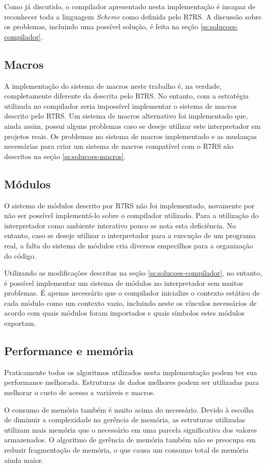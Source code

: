 Como já discutido, o compilador apresentado nesta implementação é incapaz
de reconhecer toda a linguagem \textit{Scheme} como definida pelo \acs{R7RS}.
A discussão sobre os problemas, incluindo uma possível solução, é feita na 
seção \ref{ss:solucoes-compilador}.

\subsection{Macros}
\label{ss:macros-resultados}

A implementação do sistema de macros neste trabalho é, na verdade,
completamente diferente da descrita pelo \acs{R7RS}. No entanto, com a
estratégia utilizada no compilador seria impossível implementar o sistema de
macros descrito pelo \acs{R7RS}. Um sistema de macros alternativo foi
implementado que, ainda assim, possui alguns problemas caso se deseje utilizar
este interpretador em projetos reais. Os problemas no sistema de macros
implementado e as mudanças necessárias para criar um sistema de macros
compatível com o \acs{R7RS} são descritos na seção \ref{ss:solucoes-macros}.

\subsection{Módulos}
\label{ss:modulos-resultados}

O sistema de módulos descrito por \acs{R7RS} não foi implementado, novamente
por não ser possível implementá-lo sobre o compilador utilizado. Para a 
utilização do interpretador como ambiente interativo pouco se nota esta
deficiência. No entanto, caso se deseje utilizar o interpretador para a
execução de um programa real, a falta do sistema de módulos cria diversos
empecilhos para a organização do código.

Utilizando as modificações descritas na seção \ref{ss:solucoes-compilador},
no entanto, é possível implementar um sistema de módulos no interpretador
sem muitos problemas. É apenas necessário que o compilador inicialize o
contexto estático de cada módulo como um contexto vazio, incluindo neste
os vínculos necessários de acordo com quais módulos foram importados e
quais símbolos estes módulos exportam.

\subsection{Performance e memória}
\label{ss:performance-resultados}

Praticamente todos os algoritmos utilizados nesta implementação podem ter
sua performance melhorada. Estruturas de dados melhores podem ser utilizadas
para melhorar o custo de acesso a variáveis e macros. 

O consumo de memória também é muito acima do necessário. Devido à escolha de
diminuir a complexidade na gerência de memória, as estruturas utilizadas
utilizam mais memória que o necessário em uma parcela significativa dos valores
armazenados. O algoritmo de gerência de memória também não se preocupa em
reduzir fragmentação de memória, o que causa um consumo total de memória ainda
maior.

